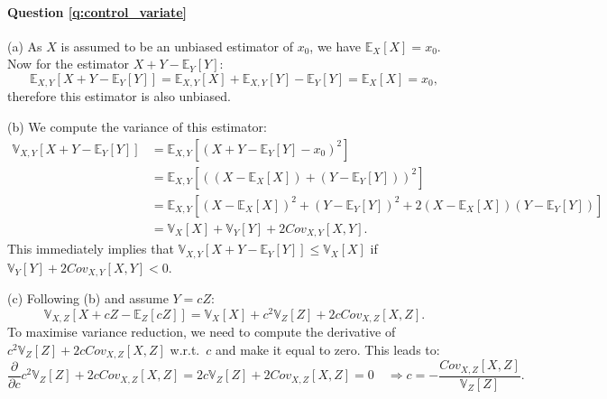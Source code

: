 \paragraph{Question \ref{q:control_variate}}
(a) As $X$ is assumed to be an unbiased estimator of $x_0$, we have $\mathbb{E}_X[X] = x_0$. Now for the estimator $X + Y - \mathbb{E}_Y[Y]$:
$$\mathbb{E}_{X, Y}[ X + Y - \mathbb{E}_Y[Y] ] = \mathbb{E}_{X, Y}[X] + \mathbb{E}_{X, Y}[Y] - \mathbb{E}_Y[Y] = \mathbb{E}_{X}[X] = x_0,$$
therefore this estimator is also unbiased. 

(b) We compute the variance of this estimator:
\begin{equation*}
\begin{aligned}
\mathbb{V}_{X, Y}[ X + Y - \mathbb{E}_Y[Y] ] &= \mathbb{E}_{X, Y}[(X + Y - \mathbb{E}_Y[Y] - x_0 )^2] \\
&= \mathbb{E}_{X, Y}[( (X - \mathbb{E}_X[X]) + (Y - \mathbb{E}_Y[Y]) )^2] \\
&= \mathbb{E}_{X, Y}[(X - \mathbb{E}_X[X])^2 + (Y - \mathbb{E}_Y[Y])^2 + 2 (X - \mathbb{E}_X[X]) (Y - \mathbb{E}_Y[Y])] \\
&= \mathbb{V}_{X}[X] + \mathbb{V}_{Y}[Y] + 2 Cov_{X, Y}[X, Y].
\end{aligned}
\end{equation*}
This immediately implies that $\mathbb{V}_{X, Y}[ X + Y - \mathbb{E}_Y[Y] ] \leq \mathbb{V}_{X}[X]$ if $\mathbb{V}_{Y}[Y] + 2 Cov_{X, Y}[X, Y] < 0$.

(c) Following (b) and assume $Y = c Z$:
\begin{equation*}
\mathbb{V}_{X, Z}[ X + c Z - \mathbb{E}_Z[c Z] ] = \mathbb{V}_{X}[X] + c^2 \mathbb{V}_{Z}[Z] + 2c Cov_{X, Z}[X, Z].
\end{equation*}
To maximise variance reduction, we need to compute the derivative of $c^2 \mathbb{V}_{Z}[Z] + 2c Cov_{X, Z}[X, Z]$ w.r.t.~$c$ and make it equal to zero. This leads to:
$$ \frac{\partial}{\partial c} c^2 \mathbb{V}_{Z}[Z] + 2c Cov_{X, Z}[X, Z] = 2c \mathbb{V}_{Z}[Z] + 2 Cov_{X, Z}[X, Z] = 0 \quad \Rightarrow c = - \frac{Cov_{X, Z}[X, Z]}{\mathbb{V}_{Z}[Z]}.$$

